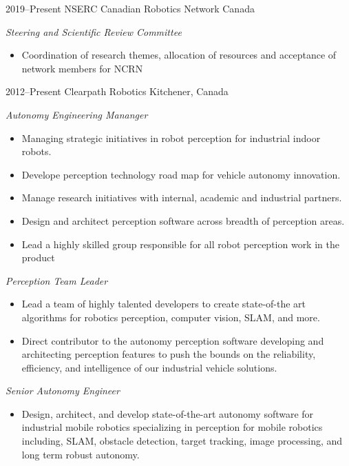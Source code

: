 \documentclass[stdletter]{friggeri-cv} %
\begin{document}
\begin{entrylist}
\entry
{2019--Present}
{NSERC Canadian Robotics Network}
{Canada}
{\emph{Steering and Scientific Review Committee}
\begin{itemize}
    \item Coordination of research themes, allocation of resources and acceptance of network members for NCRN \end{itemize} }
\entry
{2012--Present}
{Clearpath Robotics}
{Kitchener, Canada}
{\emph{Autonomy Engineering Mananger}
\begin{itemize}
    \item Managing strategic initiatives in robot perception for industrial indoor robots.
    \item Develope perception technology road map for vehicle autonomy innovation. 
    \item Manage research initiatives with internal, academic and industrial partners. 
    \item Design and architect perception software across breadth of perception areas.
    \item Lead a highly skilled group responsible for all robot perception work in the product
\end{itemize} 
\emph{Perception Team Leader} 
\begin{itemize}
    \item Lead a team of highly talented developers to create state-of-the art algorithms for robotics perception, computer vision, SLAM, and more.
    \item Direct contributor to the autonomy perception software developing and architecting perception features to push the bounds on the reliability, efficiency, and intelligence of our industrial vehicle solutions.
\end{itemize} 
\emph{Senior Autonomy Engineer} 
\begin{itemize}
    \item Design, architect, and develop state-of-the-art autonomy software for industrial mobile robotics specializing in perception for mobile robotics including, SLAM, obstacle detection, target tracking, image processing, and long term robust autonomy.

\end{itemize}}
\end{entrylist}
\end{document}
